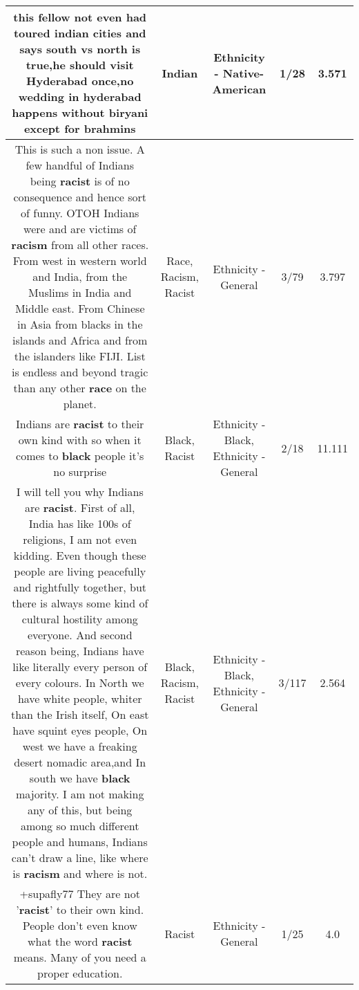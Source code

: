 \documentclass[11pt]{article}
\newlength\mylength
\begin{document}
\begin{center}
\begin{longtable}{|C{.65\mylength}|C{.30\mylength}|C{.12\mylength}|C{.12\mylength}|C{.12\mylength}|}
  \small this fellow not even had toured \textbf{indian} cities and says south vs north is true,he should visit Hyderabad once,no wedding in hyderabad happens without biryani except for brahmins\normalsize   & Indian & Ethnicity - Native-American & 1/28 & 3.571 \\  \hline
  \small This is such a non issue. A few handful of Indians being \textbf{racist} is of no consequence and hence sort of funny. OTOH Indians were and are victims of \textbf{racism} from all other races. From west in western world and India, from the Muslims in India and Middle east. From Chinese in Asia from blacks in the islands and Africa and from the islanders like FIJI. List is endless and beyond tragic than any other \textbf{race} on the planet.\normalsize   & Race, Racism, Racist & Ethnicity - General & 3/79 & 3.797 \\  \hline
  \small Indians are \textbf{racist} to their own kind with so when it comes to \textbf{black}  people it's no surprise\normalsize   & Black, Racist & Ethnicity - Black, Ethnicity - General & 2/18 & 11.111 \\  \hline
  \small I will tell you why Indians are \textbf{racist}. First of all, India has like 100s of religions, I am not even kidding. Even though these people are living peacefully and rightfully together, but there is always some kind of cultural hostility among everyone. And second reason being, Indians have like literally every person of every colours. In North we have white people, whiter than the Irish itself, On east have squint eyes people, On west we have a freaking desert nomadic area,and In south we have \textbf{black} majority. I am not making any of this, but being among so much different people and humans, Indians can't draw a line, like where is \textbf{racism} and where is not.\normalsize   & Black, Racism, Racist & Ethnicity - Black, Ethnicity - General & 3/117 & 2.564 \\  \hline
  \small +supafly77 They are not '\textbf{racist}' to their own kind. People don't even know what the word \textbf{racist} means. Many of you need a proper education.\normalsize   & Racist & Ethnicity - General & 1/25 & 4.0 \\  \hline

\end{longtable}
\end{center}
\end{document}
